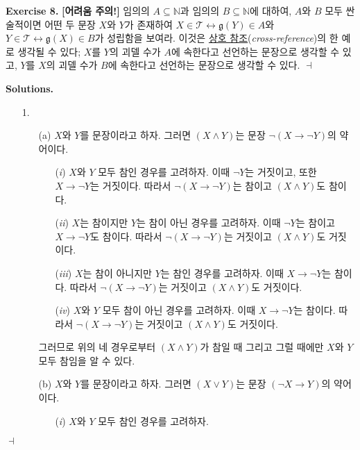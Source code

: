 \documentclass[12pt]{paper}
\newcommand{\gnum}
{ \mathfrak{g} }
\newenvironment{context}[1][]
{ \noindent \textbf{{#1}.} }
{ \hfill $ \dashv $ }
\begin{document}
\begin{context}[Exercise 8]
\textbf{[어려움 주의!]} 임의의 $A \subseteq \mathbb{N}$과 임의의 $B \subseteq \mathbb{N}$에 대하여,
$A$와 $B$ 모두 싼술적이면 어떤 두 문장 $X$와 $Y$가 존재하여 $X \in \mathcal{T} \leftrightarrow \gnum \left( Y \right) \in A$와 $Y \in \mathcal{T} \leftrightarrow \gnum \left( X \right) \in B$가 성립함을 보여라.
이것은 \underline{상호 참조}(\textit{cross-reference})의 한 예로 생각될 수 있다;
$X$를 $Y$의 괴델 수가 $A$에 속한다고 선언하는 문장으로 생각할 수 있고,
$Y$를 $X$의 괴델 수가 $B$에 속한다고 선언하는 문장으로 생각할 수 있다.
\end{context}

\begin{context}[Solutions]
\begin{enumerate}
\item[{1.}]
\begin{itemize}
\item[(a)] $X$와 $Y$를 문장이라고 하자.
그러면 $\left( X \land Y \right)$는 문장 $\lnot \left( X \rightarrow \lnot Y \right)$의 약어이다.
\begin{enumerate}
\item[(\textit{i})] $X$와 $Y$ 모두 참인 경우를 고려하자.
이때 $\lnot Y$는 거짓이고, 또한 $X \rightarrow \lnot Y$는 거짓이다.
따라서 $\lnot \left( X \rightarrow \lnot Y \right)$는 참이고 $\left( X \land Y \right)$도 참이다.
\item[(\textit{ii})] $X$는 참이지만 $Y$는 참이 아닌 경우를 고려하자.
이때 $\lnot Y$는 참이고 $X \rightarrow \lnot Y$도 참이다.
따라서 $\lnot \left( X \rightarrow \lnot Y \right)$는 거짓이고 $\left( X \land Y \right)$도 거짓이다.
\item[(\textit{iii})] $X$는 참이 아니지만 $Y$는 참인 경우를 고려하자.
이때 $X \rightarrow \lnot Y$는 참이다.
따라서 $\lnot \left( X \rightarrow \lnot Y \right)$는 거짓이고 $\left( X \land Y \right)$도 거짓이다.
\item[(\textit{iv})] $X$와 $Y$ 모두 참이 아닌 경우를 고려하자.
이때 $X \rightarrow \lnot Y$는 참이다.
따라서 $\lnot \left( X \rightarrow \lnot Y \right)$는 거짓이고 $\left( X \land Y \right)$도 거짓이다.
\end{enumerate}
그러므로 위의 네 경우로부터 $\left( X \land Y \right)$가 참일 때 그리고 그럴 때에만 $X$와 $Y$ 모두 참임을 알 수 있다.
\item[(b)] $X$와 $Y$를 문장이라고 하자.
그러면 $\left( X \lor Y \right)$는 문장 $\left( \lnot X \rightarrow Y \right)$의 약어이다.
\begin{enumerate}
\item[(\textit{i})] $X$와 $Y$ 모두 참인 경우를 고려하자.

\end{enumerate}
\end{itemize}
\end{enumerate}
\end{context}
\end{document}
